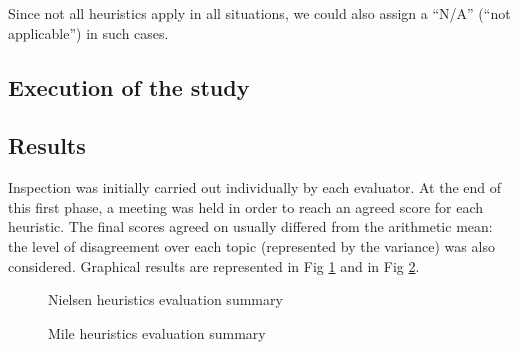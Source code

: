Since not all heuristics apply in all situations, we could also assign a ``N/A'' (``not applicable'') in such cases.

\subsection{Execution of the study}

\subsection{Results}
Inspection was initially carried out individually by each evaluator. At the end of this first phase, a meeting was held in order to reach an agreed score for each heuristic. The final scores agreed on usually differed from the arithmetic mean: the level of disagreement over each topic (represented by the variance) was also considered.
Graphical results are represented in Fig \ref{BarsNielsenCrop} and in Fig \ref{BarsMileCrop}.

\begin{figure}[!ht]
    \begin{minipage}{\linewidth}
        \centering
        \captionsetup{justification=centering}
        \caption{Nielsen heuristics evaluation summary}
        \label{BarsNielsenCrop}
    \end{minipage}
\end{figure}

\begin{figure}[!ht]
    \begin{minipage}{\linewidth}
        \centering
        \captionsetup{justification=centering}
        \caption{Mile heuristics evaluation summary}
        \label{BarsMileCrop}
    \end{minipage}
\end{figure}

